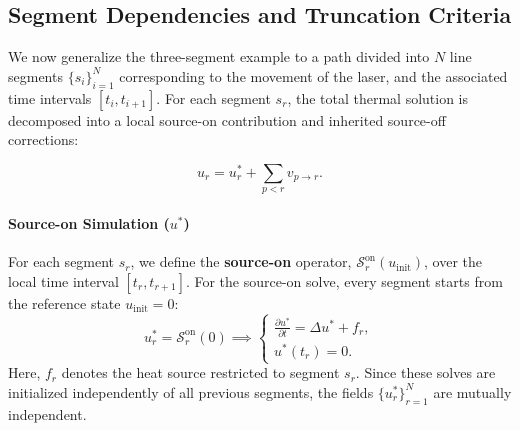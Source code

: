 \documentclass[conference]{IEEEtran}
\begin{document}
\subsection{Segment Dependencies and Truncation Criteria}

We now generalize the three-segment example to a path divided into $N$ line segments $\{s_i\}_{i=1}^N$ corresponding to the movement of the laser, and the associated time intervals $[t_i,t_{i+1}]$. For each segment $s_r$, the total thermal solution is decomposed into a local source-on contribution and inherited source-off corrections:

\begin{equation}
u_r = u_r^* + \sum_{p<r} v_{p\to r}.
\label{eq:full_form}
\end{equation}

\paragraph{Source-on Simulation ($u^*$)} 
For each segment $s_r$, we define the \textbf{source-on} operator, $\mathcal{S}^{\mathrm{on}}_r(u_{\mathrm{init}})$, over the local time interval $[t_r,t_{r+1}]$. For the source-on solve, every segment starts from the reference state $u_{\mathrm{init}} = 0$:
\begin{equation}
u_r^* = \mathcal{S}^{\mathrm{on}}_r(0) \implies 
\begin{cases} 
\frac{\partial u^*}{\partial t} = \Delta u^* + f_r, \\
u^*(t_r)=0.
\end{cases}
\label{eq:source_on}
\end{equation}
Here, $f_r$ denotes the heat source restricted to segment $s_r$. Since these solves are initialized independently of all previous segments, the fields $\{u_r^*\}_{r=1}^N$ are mutually independent.
\end{document}
